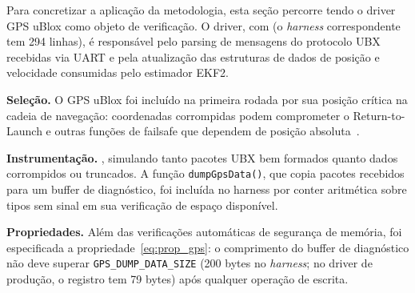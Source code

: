 

Para concretizar a aplicação da metodologia, esta seção percorre
 tendo o driver GPS uBlox como objeto de verificação. O driver,
com  (o \textit{harness}
correspondente tem 294 linhas), é responsável pelo parsing de mensagens
do protocolo UBX recebidas via UART e pela atualização das estruturas de dados de
posição e velocidade consumidas pelo estimador EKF2.

\textbf{Seleção.} O GPS uBlox foi incluído na primeira rodada por sua posição
crítica na cadeia de navegação: coordenadas corrompidas podem comprometer o
Return-to-Launch e outras funções de failsafe que dependem de posição
absoluta~\cite{Wanner2024}.

\textbf{Instrumentação.} , simulando tanto pacotes UBX bem formados
quanto dados corrompidos ou truncados. A função \texttt{dumpGpsData()}, que copia
pacotes recebidos para um buffer de diagnóstico, foi incluída no harness por
conter aritmética sobre tipos sem sinal em sua verificação de espaço disponível.

\textbf{Propriedades.} Além das verificações automáticas de segurança de
memória, foi especificada a propriedade~\eqref{eq:prop_gps}: o comprimento do
buffer de diagnóstico não deve superar \texttt{GPS\_DUMP\_DATA\_SIZE} (200
bytes no \textit{harness}; no driver de produção, o registro tem 79 bytes)
após qualquer operação de escrita.

